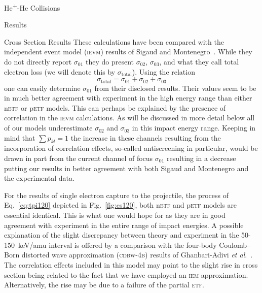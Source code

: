 \documentclass[letterpaper, 11 pt]{report}
\begin{document}
\begin{chapter}{\texorpdfstring{He\textsuperscript{+}}{He+}-He Collisions \label{chap:hephe}}
\begin{section}{Results \label{sec:hephe-disc}}
\begin{subsection}{Cross Section Results \label{sec:hephe-res}}
         These calculations have been compared with the independent event model (\textsc{ievm}) results
         of Sigaud and Montenegro~\cite{SM-03}. While they do not directly report $\sigma_{01}$ they do
         present $\sigma_{02}$, $\sigma_{03}$, and what they call total electron loss (we will denote
         this by $\sigma_\mathrm{total}$). Using the relation
         \begin{equation} \label{eq:total}
            \sigma_\mathrm{total} = \sigma_{01} + \sigma_{02} + \sigma_{03}
         \end{equation}
         one can easily determine $\sigma_{01}$ from their disclosed results. Their values seem to be in
         much better agreement with experiment in the high energy range than either n\textsc{etf} or
         p\textsc{etf} models. This can perhaps be explained by the presence of correlation in the
         \textsc{ievm} calculations. As will be discussed in more detail below all of our models
         underestimate $\sigma_{02}$ and $\sigma_{03}$ in this impact energy range. Keeping in mind that
         $\sum p_{kl} = 1$ the increase in these channels resulting from the incorporation of
         correlation effects, so-called antiscreening in particular, would be drawn in part from the
         current channel of focus $\sigma_{01}$ resulting in a decrease putting our results in better
         agreement with both Sigaud and Montenegro and the experimental data.

         For the results of single electron capture to the projectile, the process of
         Eq.~\eqref{eq:tpi120} depicted in Fig.~\ref{fig:cs120}, both n\textsc{etf} and p\textsc{etf}
         models are essential identical. This is what one would hope for as they are in good agreement
         with experiment in the entire range of impact energies. A possible explanation of the slight
         discrepancy between theory and experiment in the 50-150~keV/amu interval is offered by a
         comparison with the four-body Coulomb–Born distorted wave approximation (\textsc{cdbw-4b})
         results of Ghanbari-Adivi \textit{et al}.~\cite{GAG15}. The correlation effects included in
         this model may point to the slight rise in cross section being related to the fact that we have
         employed an \textsc{iem} approximation. Alternatively, the rise may be due to a failure of the
         partial \textsc{etf}.


\end{subsection}
\end{section}
\end{chapter}
\end{document}
